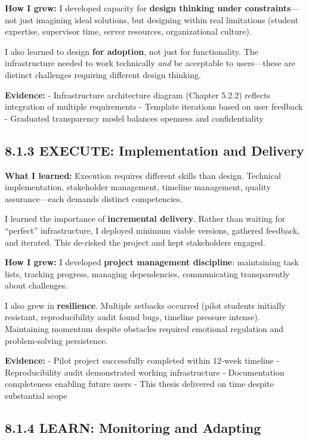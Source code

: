 \documentclass[
  oneside,
  open=any]{scrbook}
\begin{document}
\textbf{How I grew:} I developed capacity for \textbf{design thinking
under constraints}---not just imagining ideal solutions, but designing
within real limitations (student expertise, supervisor time, server
resources, organizational culture).

I also learned to design \textbf{for adoption}, not just for
functionality. The infrastructure needed to work technically \emph{and}
be acceptable to users---these are distinct challenges requiring
different design thinking.

\textbf{Evidence:} - Infrastructure architecture diagram (Chapter 5.2.2)
reflects integration of multiple requirements - Template iterations
based on user feedback - Graduated transparency model balances openness
and confidentiality

\subsection{8.1.3 EXECUTE: Implementation and
Delivery}\label{execute-implementation-and-delivery}

\textbf{What I learned:} Execution requires different skills than
design. Technical implementation, stakeholder management, timeline
management, quality assurance---each demands distinct competencies.

I learned the importance of \textbf{incremental delivery}. Rather than
waiting for ``perfect'' infrastructure, I deployed minimum viable
versions, gathered feedback, and iterated. This de-risked the project
and kept stakeholders engaged.

\textbf{How I grew:} I developed \textbf{project management discipline}:
maintaining task lists, tracking progress, managing dependencies,
communicating transparently about challenges.

I also grew in \textbf{resilience}. Multiple setbacks occurred (pilot
students initially resistant, reproducibility audit found bugs, timeline
pressure intense). Maintaining momentum despite obstacles required
emotional regulation and problem-solving persistence.

\textbf{Evidence:} - Pilot project successfully completed within 12-week
timeline - Reproducibility audit demonstrated working infrastructure -
Documentation completeness enabling future users - This thesis delivered
on time despite substantial scope

\subsection{8.1.4 LEARN: Monitoring and
Adapting}\label{learn-monitoring-and-adapting}
\end{document}

